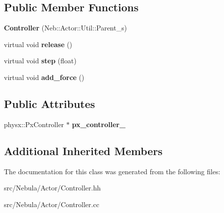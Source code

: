 \subsection*{Public Member Functions}
\begin{DoxyCompactItemize}
\item 
\hypertarget{classNeb_1_1Actor_1_1Controller_af5e1a68f2a9f3613beebdaad7ae15457}{{\bfseries Controller} (Neb\-::\-Actor\-::\-Util\-::\-Parent\-\_\-s)}\label{classNeb_1_1Actor_1_1Controller_af5e1a68f2a9f3613beebdaad7ae15457}

\item 
\hypertarget{classNeb_1_1Actor_1_1Controller_a4cf7cbd70138ea33c509d89ebc74e45d}{virtual void {\bfseries release} ()}\label{classNeb_1_1Actor_1_1Controller_a4cf7cbd70138ea33c509d89ebc74e45d}

\item 
\hypertarget{classNeb_1_1Actor_1_1Controller_a37d671a837e578ee05e2f9e1a5292e79}{virtual void {\bfseries step} (float)}\label{classNeb_1_1Actor_1_1Controller_a37d671a837e578ee05e2f9e1a5292e79}

\item 
\hypertarget{classNeb_1_1Actor_1_1Controller_aed64790b9ac840ebb4e6da3af3a6e405}{virtual void {\bfseries add\-\_\-force} ()}\label{classNeb_1_1Actor_1_1Controller_aed64790b9ac840ebb4e6da3af3a6e405}

\end{DoxyCompactItemize}
\subsection*{Public Attributes}
\begin{DoxyCompactItemize}
\item 
\hypertarget{classNeb_1_1Actor_1_1Controller_a488fba03acad68f997a3f38f4fac41fd}{physx\-::\-Px\-Controller $\ast$ {\bfseries px\-\_\-controller\-\_\-}}\label{classNeb_1_1Actor_1_1Controller_a488fba03acad68f997a3f38f4fac41fd}

\end{DoxyCompactItemize}
\subsection*{Additional Inherited Members}


The documentation for this class was generated from the following files\-:\begin{DoxyCompactItemize}
\item 
src/\-Nebula/\-Actor/Controller.\-hh\item 
src/\-Nebula/\-Actor/Controller.\-cc\end{DoxyCompactItemize}
